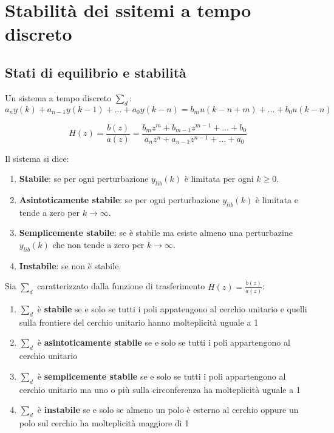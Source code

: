 \section{Stabilità dei ssitemi a tempo discreto}

\subsection{Stati di equilibrio e stabilità}
Un sistema a tempo discreto $\sum_d$:
\begin{equation}
  a_n y(k) + a_{n-1} y(k-1) + \dots + a_0 y(k-n) = b_m u(k-n+m) + \dots + b_0 u(k-n)
\end{equation}

\begin{equation}
  H(z) = \frac{b(z)}{a(z)} = \frac{b_m z^m + b_{m-1} z^{m-1} + \dots + b_0}{a_n z^n + a_{n-1} z^{n-1} + \dots + a_0}
\end{equation}

\begin{definition}
  Il sistema si dice:
  \begin{enumerate}
    \item \textbf{Stabile}: se per ogni perturbazione $y_{lib}(k)$ è limitata per ogni $k \geq 0$.
    \item \textbf{Asintoticamente stabile}: se per ogni perturbazione $y_{lib}(k)$ è limitata e tende a zero per $k \rightarrow \infty$.
    \item \textbf{Semplicemente stabile}: se è stabile ma esiste almeno una perturbazine $y_{lib}(k)$ che non tende a zero per $k \rightarrow \infty$.
    \item \textbf{Instabile}: se non è stabile.
  \end{enumerate}
\end{definition}


\begin{definition}
  Sia $\sum_d$ caratterizzato dalla funzione di trasferimento $H(z) = \frac{b(z)}{a(z)}$:
  \begin{enumerate}
    \item $\sum_d$ è \textbf{stabile} se e solo se tutti i poli appatengono al
    cerchio unitario e quelli sulla frontiere del cerchio unitario hanno
    molteplicità uguale a 1

    \item $\sum_d$ è \textbf{asintoticamente stabile} se e solo se tutti i poli
    appartengono al cerchio unitario

    \item $\sum_d$ è \textbf{semplicemente stabile} se e solo se tutti i poli
    appartengono al cerchio unitario ma uno o più sulla circonferenza ha
    molteplicità uguale a 1

    \item $\sum_d$ è \textbf{instabile} se e solo se almeno un polo è esterno
    al cerchio oppure un polo sul cerchio ha molteplicità maggiore di 1
  \end{enumerate}
\end{definition}


